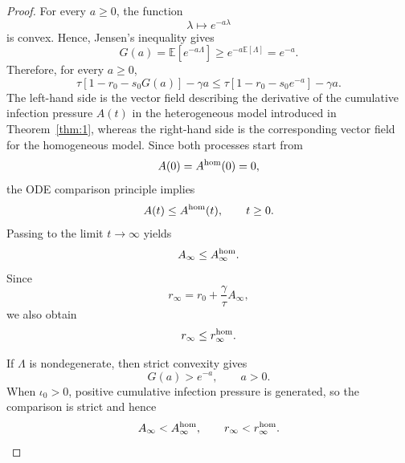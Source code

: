 \documentclass[pdflatex,sn-mathphys-ay]{sn-jnl}
\theoremstyle{thmstyleone}
\theoremstyle{thmstyletwo}
\theoremstyle{thmstylethree}
\newcommand{\E}{\mathbb{E}}
\begin{document}
\begin{proof}
For every \(a\geq 0\), the function
\[
\lambda\longmapsto e^{-a\lambda}
\]
is convex. Hence, Jensen's inequality gives
\[
G(a)
=
\E\!\left[e^{-a\Lambda}\right]
\geq
e^{-a\E[\Lambda]}
=
e^{-a}.
\]
Therefore, for every \(a\geq0\),
\[
\tau\left[1-r_0-s_0G(a)\right]-\gamma a
\leq
\tau\left[1-r_0-s_0e^{-a}\right]-\gamma a.
\]
The left-hand side is the vector field describing the derivative of the cumulative infection pressure \(A(t)\) in the heterogeneous model introduced in Theorem~\ref{thm:1}, whereas the right-hand side is the corresponding vector field for the homogeneous model.
 Since both processes
start from
\[
A(0)=A^{\rm hom}(0)=0,
\]
the  ODE comparison principle implies
\[
A(t)\leq A^{\rm hom}(t),
\qquad t\geq0.
\]
Passing to the limit \(t\to\infty\) yields
\[
A_\infty\leq A_\infty^{\rm hom}.
\]
Since
\[
r_\infty
=
r_0+\frac{\gamma}{\tau}A_\infty,
\]
we also obtain
\[
r_\infty\leq r_\infty^{\rm hom}.
\]

If \(\Lambda\) is nondegenerate, then strict convexity gives
\[
G(a)>e^{-a},
\qquad a>0.
\]
When \(\iota_0>0\), positive cumulative infection pressure is generated, so
the comparison is strict and hence
\[
A_\infty<A_\infty^{\rm hom},
\qquad
r_\infty<r_\infty^{\rm hom}.
\]
\end{proof}
\end{document}
